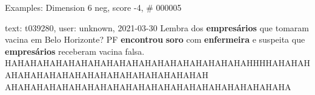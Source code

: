 \begin{frame}{Examples: Dimension 6 neg, score -4, \# 000005}
\footnotesize
\begin{alertblock}{text: t039280, user: unknown, 2021-03-30}
Lembra dos \textbf{empresários} que tomaram vacina em Belo Horizonte? PF 
\textbf{encontrou} \textbf{soro} com \textbf{enfermeira} e suspeita que 
\textbf{empresários} receberam vacina falsa. 
HAHAHAHAHAHAHAHAHAHAHAHAHAHAHAHAHAHAHAHHHHAHAHAHAHAHAHAHAHAHAHAHAHAHAHAHAHAHAHAH
AHAHAHAHAHAHAHAHAHAHAHAHAHAHAHAHAHAHAHAHAHAHA 
\end{alertblock}
\end{frame}
